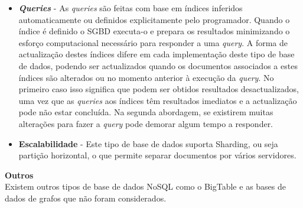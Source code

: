 \documentclass[]{article}
\begin{document}
\begin{itemize}
\item
\textbf{\emph{Queries}} - As \emph{queries} são feitas com base em índices inferidos automaticamente ou definidos explicitamente pelo programador. Quando o índice é definido o SGBD executa-o e prepara os resultados minimizando o esforço computacional necessário para responder a uma \emph{query}.
A forma de actualização destes índices difere em cada implementação deste tipo de base de dados, podendo ser actualizados quando os documentos associados a estes índices são alterados ou no momento anterior à execução da \emph{query}. No primeiro caso isso significa que podem ser obtidos resultados desactualizados, uma vez que as \emph{queries} aos índices têm resultados imediatos e a actualização pode não estar concluída. Na segunda abordagem, se existirem muitas alterações para fazer a \emph{query} pode demorar algum tempo a responder.
\item
\textbf{Escalabilidade} - Este tipo de base de dados suporta Sharding, ou seja partição horizontal, o que permite separar documentos por vários servidores.
\end{itemize}
\textbf{Outros}\\

Existem outros tipos de base de dados NoSQL como o BigTable e as bases de dados de grafos que não foram considerados.
\end{document}
